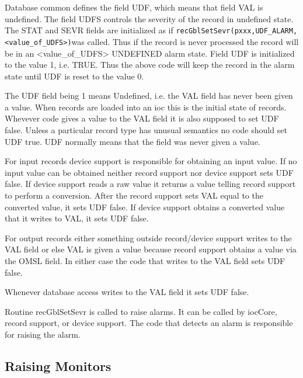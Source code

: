 Database common defines the field UDF, which means that field VAL is undefined.
The field UDFS controls the severity of the record in undefined state.
The STAT and SEVR fields are initialized as if \verb|recGblSetSevr(pxxx,UDF_ALARM,<value_of_UDFS>)|was called.
Thus if the record is never processed the record will be in an <value\_of\_UDFS> UNDEFINED alarm state.
Field UDF is initialized to the value 1, i.e. TRUE.
Thus the above code will keep the record in the alarm state until UDF is reset to the value 0.

The UDF field being 1 means Undefined, i.e. the VAL field has never been given a value.
When records are loaded into an ioc this is the initial state of records.
Whevever code gives a value to the VAL field it is also supposed to set UDF false.
Unless a particular record type has unusual semantics no code should set UDF true.
UDF normally means that the field was never given a value.

For input records device support is responsible for obtaining an input value.
If no input value can be obtained neither record support nor device support sets UDF false.
If device support reads a raw value it returns a value telling record support to perform a conversion.
After the record support sets VAL equal to the converted value, it sets UDF false.
If device support obtains a converted value that it writes to VAL, it sets UDF false.

For output records either something outside record/device support writes to the VAL field or else VAL is given a value because record support obtains a value via the OMSL field.
In either case the code that writes to the VAL field sets UDF false.

Whenever database access writes to the VAL field it sets UDF false.

Routine recGblSetSevr is called to raise alarms.
It can be called by iocCore, record support, or device support.
The code that detects an alarm is responsible for raising the alarm.

\subsection{Raising Monitors}

